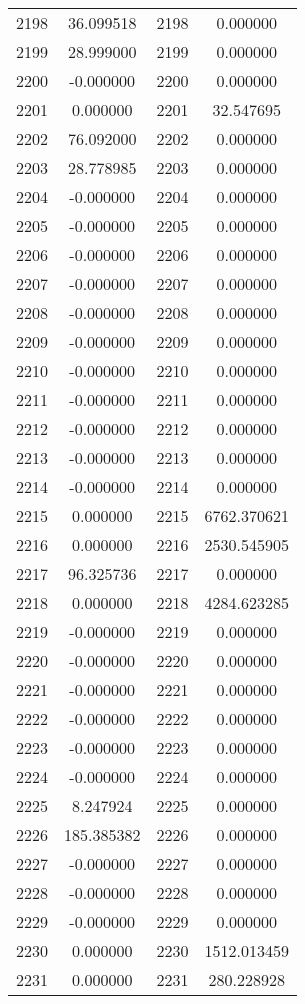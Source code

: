 \documentclass[12pt]{article}
\begin{document}
\begin{longtable}{@{}cccc@{}}
2198 & 36.099518 & 2198 & 0.000000 \\
2199 & 28.999000 & 2199 & 0.000000 \\
2200 & -0.000000 & 2200 & 0.000000 \\
2201 & 0.000000 & 2201 & 32.547695 \\
2202 & 76.092000 & 2202 & 0.000000 \\
2203 & 28.778985 & 2203 & 0.000000 \\
2204 & -0.000000 & 2204 & 0.000000 \\
2205 & -0.000000 & 2205 & 0.000000 \\
2206 & -0.000000 & 2206 & 0.000000 \\
2207 & -0.000000 & 2207 & 0.000000 \\
2208 & -0.000000 & 2208 & 0.000000 \\
2209 & -0.000000 & 2209 & 0.000000 \\
2210 & -0.000000 & 2210 & 0.000000 \\
2211 & -0.000000 & 2211 & 0.000000 \\
2212 & -0.000000 & 2212 & 0.000000 \\
2213 & -0.000000 & 2213 & 0.000000 \\
2214 & -0.000000 & 2214 & 0.000000 \\
2215 & 0.000000 & 2215 & 6762.370621 \\
2216 & 0.000000 & 2216 & 2530.545905 \\
2217 & 96.325736 & 2217 & 0.000000 \\
2218 & 0.000000 & 2218 & 4284.623285 \\
2219 & -0.000000 & 2219 & 0.000000 \\
2220 & -0.000000 & 2220 & 0.000000 \\
2221 & -0.000000 & 2221 & 0.000000 \\
2222 & -0.000000 & 2222 & 0.000000 \\
2223 & -0.000000 & 2223 & 0.000000 \\
2224 & -0.000000 & 2224 & 0.000000 \\
2225 & 8.247924 & 2225 & 0.000000 \\
2226 & 185.385382 & 2226 & 0.000000 \\
2227 & -0.000000 & 2227 & 0.000000 \\
2228 & -0.000000 & 2228 & 0.000000 \\
2229 & -0.000000 & 2229 & 0.000000 \\
2230 & 0.000000 & 2230 & 1512.013459 \\
2231 & 0.000000 & 2231 & 280.228928 \\

\end{longtable}
\end{document}
